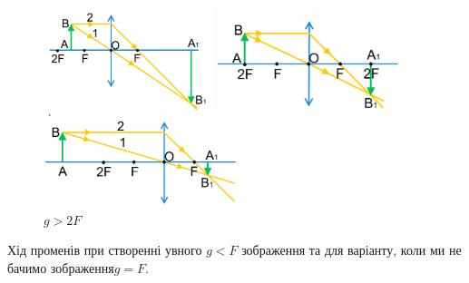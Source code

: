 \begin{enumerate}
    \begin{figure}[h!]
        \hfill
        \begin{minipage}[h]{0.3\linewidth}
            \includegraphics[height = 3cm]{assets/F2F.png}
            \caption{$F < g < 2F$}
        \end{minipage}        
        \begin{minipage}[h]{0.32\linewidth}
            \vfill
            \includegraphics[height = 2.7cm]{assets/2F.png}
            \vspace{0.1cm}
            \caption{$g = 2F$}
        \end{minipage}
        \begin{minipage}[h]{0.32\linewidth}
            \vfill
            \includegraphics[height = 2.7cm]{assets/G2F.png}
            \vspace{0.1cm}
            \caption{$g > 2F$}
        \end{minipage}
    \end{figure}

    Хід променів при створенні увного $g < F$ зображення та 
    для варіанту, коли ми не бачимо зображення$g = F$.


\end{enumerate}

